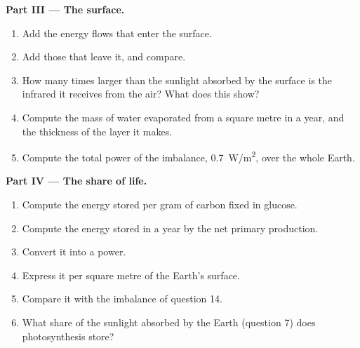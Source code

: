 \begin{problem}
\medskip
\noindent\textbf{Part III --- The surface.}
\begin{enumerate}[resume]
  \item Add the energy flows that enter the surface.
  \item Add those that leave it, and compare.
  \item How many times larger than the sunlight absorbed by the surface is
        the infrared it receives from the air? What does this show?
  \item Compute the mass of water evaporated from a square metre in a year,
        and the thickness of the layer it makes.
  \item Compute the total power of the imbalance, \qty{0.7}{W/m^2}, over the
        whole Earth.
\end{enumerate}

\medskip
\noindent\textbf{Part IV --- The share of life.}
\begin{enumerate}[resume]
  \item Compute the energy stored per gram of carbon fixed in glucose.
  \item Compute the energy stored in a year by the net primary production.
  \item Convert it into a power.
  \item Express it per square metre of the Earth's surface.
  \item Compare it with the imbalance of question 14.
  \item What share of the sunlight absorbed by the Earth (question 7) does
        photosynthesis store?
\end{enumerate}
\end{problem}
